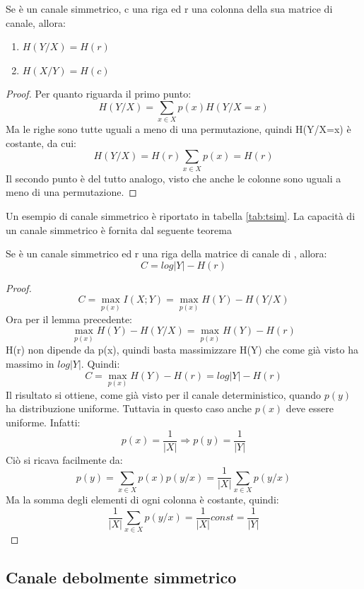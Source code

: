 \begin{lemma}
 Se  è un canale simmetrico, c una riga ed r una colonna della sua matrice di canale, allora:
 \begin{enumerate}
  \item $H(Y/X)=H(r)$
  \item $H(X/Y)=H(c)$
 \end{enumerate}
 \begin{proof}
  \mbox{}

  \noindent
  Per quanto riguarda il primo punto:
  \[
   H(Y/X)=\sum_{x \in X}p(x)H(Y/X=x)
  \]
  Ma le righe sono tutte uguali a meno di una permutazione, quindi H(Y/X=x) è costante, da cui:
  \[
   H(Y/X)=H(r)\sum_{x \in X}p(x)=H(r)
  \]
  Il secondo punto è del tutto analogo, visto che anche le colonne sono uguali a meno di una permutazione.
 \end{proof}

\end{lemma}

\noindent
Un esempio di canale simmetrico è riportato in tabella \ref{tab:tsim}.
La capacità di un canale simmetrico è fornita dal seguente teorema

\begin{teorema}
 Se  è un canale simmetrico ed r una riga della matrice di canale di , allora:
 \[
  C=log|Y| - H(r)
 \]
 \begin{proof}
\[
  C=\max_{p(x)} I(X;Y)=\max_{p(x)} H(Y)-H(Y/X)
\]
 Ora per il lemma precedente:
 \[
  \max_{p(x)} H(Y)-H(Y/X)=\max_{p(x)} H(Y)-H(r)
 \]
 H(r) non dipende da p(x), quindi basta massimizzare H(Y) che come già visto ha massimo in $log|Y|$. Quindi:
 \[
  C=\max_{p(x)} H(Y)-H(r)=log |Y| - H(r)
 \]
 Il risultato si ottiene, come già visto per il canale deterministico, quando $p(y)$ ha distribuzione uniforme.
 Tuttavia in questo caso anche $p(x)$ deve essere uniforme. Infatti:
 \[
  p(x)=\frac{1}{|X|} \Rightarrow p(y)=\frac{1}{|Y|}
 \]
 Ciò si ricava facilmente da:
 \[
  p(y)=\sum_{x \in X} p(x)p(y/x)=\frac{1}{|X|} \sum_{x \in X}p(y/x)
 \]
 Ma la somma degli elementi di ogni colonna è costante, quindi:
 \[
  \frac{1}{|X|} \sum_{x \in X}p(y/x)=\frac{1}{|X|} const=\frac{1}{|Y|}
 \]
 \end{proof}

\end{teorema}

\subsection{Canale debolmente simmetrico}

